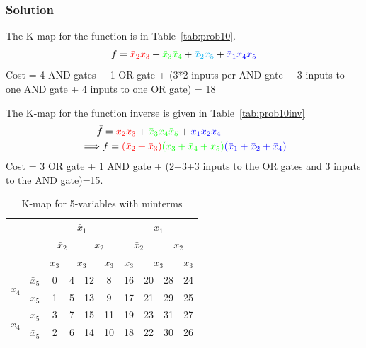 \documentclass[twocolumn]{article}
\newcommand{\bx}{\bar{x}}
\newcommand{\cred}{\color{red}}
\newcommand{\cg}{\color{green}}
\newcommand{\cb}{\color{blue}}
\begin{document}
\subsubsection*{Solution}
The K-map for the function is in Table~\ref{tab:prob10}.
\[
  f = {\cred \bx_2 x_3 } + {\cg \bx_3 \bx_4} + {\color{cyan} \bx_2 x_5 } + {\cb \bx_1 x_4 x_5}
\]
 Cost = 4 AND gates + 1 OR gate + (3*2 inputs per AND gate + 3 inputs to one AND
 gate + 4 inputs to one OR gate) = 18

 The K-map for the function inverse is given in Table~\ref{tab:prob10inv}
 \begin{align*}
   \bar{f} &= {\cred x_2 x_3} + {\cg \bx_3 x_4 \bx_5 } + {\cb x_1 x_2 x_4}
   \\
   \implies  &f = {\cred (\bx_2 + \bx_3)}{\cg (x_3 + \bx_4 + x_5)}{\cb (\bx_1 + \bx_2 + \bx_4)}
 \end{align*}
 Cost = 3 OR gate + 1 AND gate + (2+3+3 inputs to the OR gates and 3 inputs to the AND gate)=15.
 



\begin{table}
  \begin{tabular}{c|c|c|c|c|c|c|c|c|c}
  \toprule
  && \multicolumn{4}{c|}{$\bx_1$} & \multicolumn{4}{c}{$x_1$}
    \\
    && \multicolumn{2}{c|}{$\bx_2$} & \multicolumn{2}{c|}{$x_2$}
               & \multicolumn{2}{c|}{$\bx_2$} & \multicolumn{2}{c}{$x_2$}
  \\
  && $\bx_3$ & \multicolumn{2}{c|}{$x_3$} & $\bx_3$
              & $\bx_3$ & \multicolumn{2}{c|}{$x_3$} & $\bx_3$
  \\ \midrule
  \multirow{2}{*}{$\bx_4$} & $\bx_5$
                                  & 0 & 4 & 12 & 8
                                              & 16 & 20 &  28 & 24
  \\
  & $x_5$
                                  & 1 & 5 & 13 & 9
                                              & 17 & 21 &  29 & 25
  \\
  \multirow{2}{*}{$x_4$}   &  $x_5$
                                  & 3 & 7 & 15 & 11
                                              & 19 & 23 &  31 & 27
  \\
  & $\bx_5$
                                  & 2 & 6 & 14 & 10
                                              & 18 & 22 &  30 & 26
  \\\bottomrule
\end{tabular}
\caption{K-map for 5-variables with minterms}
\end{table}
\end{document}
